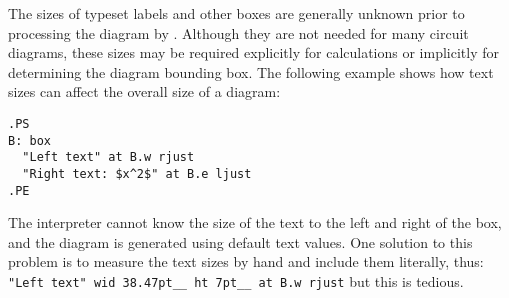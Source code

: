 The sizes of typeset labels and other \tex boxes are generally unknown
prior to processing the diagram by \latex.
Although they are not needed for many circuit diagrams,
these sizes may be required explicitly for calculations or implicitly
for determining the diagram bounding box.  
The following example shows how text sizes can affect the overall size of
a diagram:

\begin{verbatim}
.PS
B: box
  "Left text" at B.w rjust
  "Right text: $x^2$" at B.e ljust
.PE
\end{verbatim}

The \pic interpreter cannot know the size of the text to the left
and right of the box, and the diagram is generated using
default text values.  One solution to this problem is to measure the
text sizes by hand and include them literally, thus:\hfill\break
\hbox{}\quad%
\verb|"Left text" wid 38.47pt__ ht 7pt__ at B.w rjust|\hfill\break
but this is tedious.

